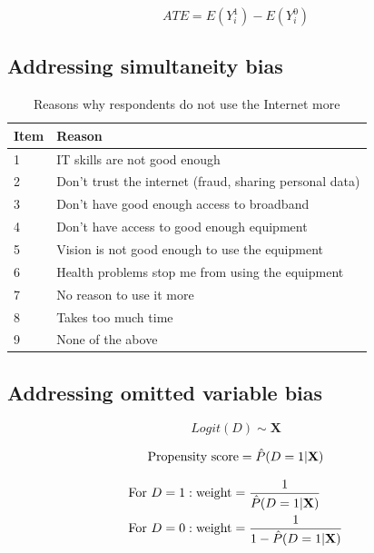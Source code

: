 \begin{equation}
    \label{eq:ate}
    ATE = E(Y_i^1) - E(Y_i^0)
\end{equation}


\subsection{Addressing simultaneity bias}


\begin{table}[h!]
    \centering
    \caption{Reasons why respondents do not use the Internet more}
    \label{tab:reverse_causality}
    \begin{tabular}{ll}
        \toprule
        Item & Reason \\
        \midrule
        1 & IT skills are not good enough \\
        2 & Don't trust the internet (fraud, sharing personal data) \\
        3 & Don't have good enough access to broadband \\
        4 & Don't have access to good enough equipment \\
        5 & Vision is not good enough to use the equipment \\ 
        6 & Health problems stop me from using the equipment \\ 
        7 & No reason to use it more \\
        8 & Takes too much time \\
        9 & None of the above \\
        \bottomrule
    \end{tabular}
\end{table}


\subsection{Addressing omitted variable bias}


\begin{equation}
    \label{eq:logit_rq1}
    Logit(D) \sim \textbf{X}
\end{equation}

\begin{equation}
    \label{eq:propensity_score_rq1}
    \textnormal{Propensity score} = \hat{P}(D = 1 | \textbf{X})
\end{equation}


\begin{equation}
    \label{eq:raw_weights}
    \begin{aligned}
        \textnormal{For } D &= 1: \textnormal{weight} = \frac{1}{\hat{P}(D = 1 | \textbf{X})} \\
        \textnormal{For } D &= 0: \textnormal{weight} = \frac{1}{1 - \hat{P}(D = 1 | \textbf{X})}
    \end{aligned}
\end{equation}



